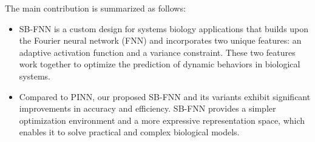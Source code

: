 

    
    
    

The main contribution is summarized as follows:
\begin{itemize}
    \item SB-FNN is a custom design for systems biology applications that builds upon the Fourier neural network (FNN) and incorporates two unique features: an adaptive activation function and a variance constraint. These two features work together to optimize the prediction of dynamic behaviors in biological systems.
    \item Compared to PINN, our proposed SB-FNN and its variants exhibit significant improvements in accuracy and efficiency. SB-FNN provides a simpler optimization environment and a more expressive representation space, which enables it to solve practical and complex biological models.
\end{itemize}

